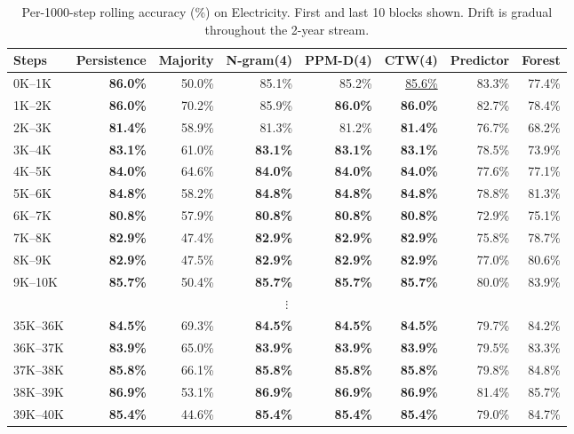 \begin{table}[h]
\centering
\caption{Per-1000-step rolling accuracy (\%) on Electricity. First and last 10 blocks shown. Drift is gradual throughout the 2-year stream.}
\label{tab:electricity_blocks}
\begin{tabular}{lrrrrrrr}
\toprule
Steps & Persistence & Majority & N-gram(4) & PPM-D(4) & CTW(4) & Predictor & Forest \\
\midrule
0K--1K & \textbf{86.0\%} & 50.0\% & 85.1\% & 85.2\% & \underline{85.6\%} & 83.3\% & 77.4\% \\
1K--2K & \textbf{86.0\%} & 70.2\% & 85.9\% & \textbf{86.0\%} & \textbf{86.0\%} & 82.7\% & 78.4\% \\
2K--3K & \textbf{81.4\%} & 58.9\% & 81.3\% & 81.2\% & \textbf{81.4\%} & 76.7\% & 68.2\% \\
3K--4K & \textbf{83.1\%} & 61.0\% & \textbf{83.1\%} & \textbf{83.1\%} & \textbf{83.1\%} & 78.5\% & 73.9\% \\
4K--5K & \textbf{84.0\%} & 64.6\% & \textbf{84.0\%} & \textbf{84.0\%} & \textbf{84.0\%} & 77.6\% & 77.1\% \\
5K--6K & \textbf{84.8\%} & 58.2\% & \textbf{84.8\%} & \textbf{84.8\%} & \textbf{84.8\%} & 78.8\% & 81.3\% \\
6K--7K & \textbf{80.8\%} & 57.9\% & \textbf{80.8\%} & \textbf{80.8\%} & \textbf{80.8\%} & 72.9\% & 75.1\% \\
7K--8K & \textbf{82.9\%} & 47.4\% & \textbf{82.9\%} & \textbf{82.9\%} & \textbf{82.9\%} & 75.8\% & 78.7\% \\
8K--9K & \textbf{82.9\%} & 47.5\% & \textbf{82.9\%} & \textbf{82.9\%} & \textbf{82.9\%} & 77.0\% & 80.6\% \\
9K--10K & \textbf{85.7\%} & 50.4\% & \textbf{85.7\%} & \textbf{85.7\%} & \textbf{85.7\%} & 80.0\% & 83.9\% \\
\multicolumn{8}{c}{$\vdots$} \\
35K--36K & \textbf{84.5\%} & 69.3\% & \textbf{84.5\%} & \textbf{84.5\%} & \textbf{84.5\%} & 79.7\% & 84.2\% \\
36K--37K & \textbf{83.9\%} & 65.0\% & \textbf{83.9\%} & \textbf{83.9\%} & \textbf{83.9\%} & 79.5\% & 83.3\% \\
37K--38K & \textbf{85.8\%} & 66.1\% & \textbf{85.8\%} & \textbf{85.8\%} & \textbf{85.8\%} & 79.8\% & 84.8\% \\
38K--39K & \textbf{86.9\%} & 53.1\% & \textbf{86.9\%} & \textbf{86.9\%} & \textbf{86.9\%} & 81.4\% & 85.7\% \\
39K--40K & \textbf{85.4\%} & 44.6\% & \textbf{85.4\%} & \textbf{85.4\%} & \textbf{85.4\%} & 79.0\% & 84.7\% \\

\end{tabular}
\end{table}
